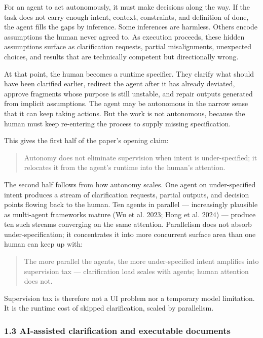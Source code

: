 \documentclass[
  nonatbib,
  preprint]{article}
\begin{document}
For an agent to act autonomously, it must make decisions along the way.
If the task does not carry enough intent, context, constraints, and
definition of done, the agent fills the gaps by inference. Some
inferences are harmless. Others encode assumptions the human never
agreed to. As execution proceeds, these hidden assumptions surface as
clarification requests, partial misalignments, unexpected choices, and
results that are technically competent but directionally wrong.

At that point, the human becomes a runtime specifier. They clarify what
should have been clarified earlier, redirect the agent after it has
already deviated, approve fragments whose purpose is still unstable, and
repair outputs generated from implicit assumptions. The agent may be
autonomous in the narrow sense that it can keep taking actions. But the
work is not autonomous, because the human must keep re-entering the
process to supply missing specification.

This gives the first half of the paper's opening claim:

\begin{quote}
Autonomy does not eliminate supervision when intent is under-specified;
it relocates it from the agent's runtime into the human's attention.
\end{quote}

The second half follows from how autonomy scales. One agent on
under-specified intent produces a stream of clarification requests,
partial outputs, and decision points flowing back to the human. Ten
agents in parallel --- increasingly plausible as multi-agent frameworks
mature (Wu et al. 2023; Hong et al. 2024) --- produce ten such streams
converging on the same attention. Parallelism does not absorb
under-specification; it concentrates it into more concurrent surface
area than one human can keep up with:

\begin{quote}
The more parallel the agents, the more under-specified intent amplifies
into supervision tax --- clarification load scales with agents; human
attention does not.
\end{quote}

Supervision tax is therefore not a UI problem nor a temporary model
limitation. It is the runtime cost of skipped clarification, scaled by
parallelism.

\subsubsection{1.3 AI-assisted clarification and executable
documents}\label{ai-assisted-clarification-and-executable-documents}
\end{document}

